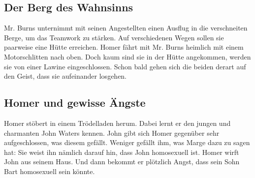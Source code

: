 
	
\subsection{Der Berg des Wahnsinns}
Mr. Burns unternimmt mit seinen Angestellten einen Ausflug in die verschneiten Berge, um das Teamwork zu stärken. Auf verschiedenen Wegen sollen sie paarweise eine Hütte erreichen. Homer fährt mit Mr. Burns heimlich mit einem Motorschlitten nach oben. Doch kaum sind sie in der Hütte angekommen, werden sie von einer Lawine eingeschlossen. Schon bald gehen sich die beiden derart auf den Geist, dass sie aufeinander losgehen.


	
\subsection{Homer und gewisse Ängste}\label{4F11}
Homer stöbert in einem Trödelladen herum. Dabei lernt er den jungen und charmanten John Waters \cite{SOTB} kennen. John gibt sich Homer gegenüber sehr aufgeschlossen, was diesem gefällt. Weniger gefällt ihm, was Marge dazu zu sagen hat: Sie weist ihn nämlich darauf hin, dass John homosexuell ist. Homer wirft John aus seinem Haus. Und dann bekommt er plötzlich Angst, dass sein Sohn Bart homosexuell sein könnte.

